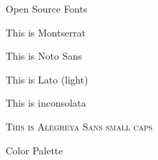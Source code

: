 \begin{frame}{Open Source Fonts}
 \begin{fullpageitemize}
  \item {\montserratfont This is Montserrat}
  \item {\notosansfont This is Noto Sans}
  \item {\latolightfont This is Lato (light)}
  \item {\inconsolatafont This is inconsolata}
  \item \textsc{This is Alegreya Sans small caps}
 \end{fullpageitemize}
\end{frame}
\begin{frame}{Color Palette}
 \begin{center}
  \crule[colordgray] \crule[colorhgray] \crule[colorblue] \crule[colorgreen] \crule[colororange]
 \end{center}
\end{frame}


